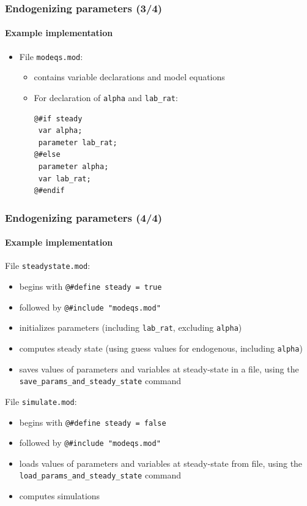 \documentclass[handout,usepdftitle=false,xcolor=dvipsnames,aspectratio=169]{beamer}
\begin{document}
\begin{frame}[fragile]
  \frametitle{Endogenizing parameters (3/4)}
  \framesubtitle{Example implementation}
  \begin{itemize}
    \item File \texttt{modeqs.mod}:
          \begin{itemize}
            \item contains variable declarations and model equations
            \item For declaration of \texttt{alpha} and \texttt{lab\_rat}:
                  \footnotesize
                  \begin{verbatim}
@#if steady
 var alpha;
 parameter lab_rat;
@#else
 parameter alpha;
 var lab_rat;
@#endif
\end{verbatim}
                  \normalsize
          \end{itemize}

  \end{itemize}
\end{frame}

\begin{frame}[fragile]
  \frametitle{Endogenizing parameters (4/4)}
  \framesubtitle{Example implementation}
  \begin{witemize}
    \item File \texttt{steadystate.mod}:
    \begin{itemize}
      \item begins with \texttt{@\#define steady = true}
      \item followed by \texttt{@\#include "modeqs.mod"}
      \item initializes parameters (including \texttt{lab\_rat}, excluding \texttt{alpha})
      \item computes steady state (using guess values for endogenous, including \texttt{alpha})
      \item saves values of parameters and variables at steady-state in a file, using the\\ \texttt{save\_params\_and\_steady\_state} command
    \end{itemize}
    \item File \texttt{simulate.mod}:
    \begin{itemize}
      \item begins with \texttt{@\#define steady = false}
      \item followed by \texttt{@\#include "modeqs.mod"}
      \item loads values of parameters and variables at steady-state from file, using the\\ \texttt{load\_params\_and\_steady\_state} command
      \item computes simulations
    \end{itemize}
  \end{witemize}
\end{frame}
\end{document}
